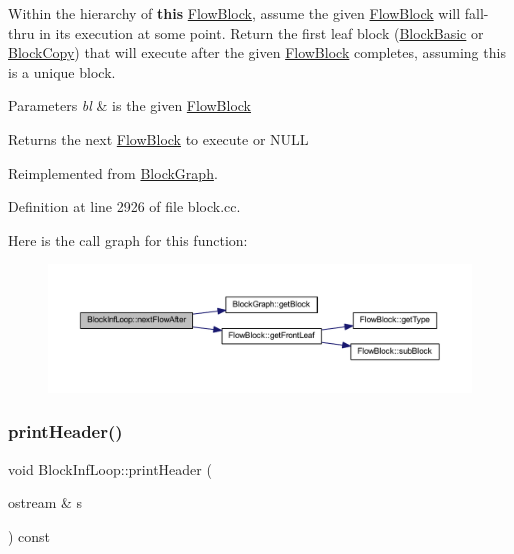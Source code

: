 Within the hierarchy of {\bfseries{this}} \mbox{\hyperlink{class_flow_block}{Flow\+Block}}, assume the given \mbox{\hyperlink{class_flow_block}{Flow\+Block}} will fall-\/thru in its execution at some point. Return the first leaf block (\mbox{\hyperlink{class_block_basic}{Block\+Basic}} or \mbox{\hyperlink{class_block_copy}{Block\+Copy}}) that will execute after the given \mbox{\hyperlink{class_flow_block}{Flow\+Block}} completes, assuming this is a unique block. 
\begin{DoxyParams}{Parameters}
{\em bl} & is the given \mbox{\hyperlink{class_flow_block}{Flow\+Block}} \\
\hline
\end{DoxyParams}
\begin{DoxyReturn}{Returns}
the next \mbox{\hyperlink{class_flow_block}{Flow\+Block}} to execute or N\+U\+LL 
\end{DoxyReturn}


Reimplemented from \mbox{\hyperlink{class_block_graph_aba0d42cf572bdcf2bca44d22fad971f6}{Block\+Graph}}.



Definition at line 2926 of file block.\+cc.

Here is the call graph for this function\+:
\nopagebreak
\begin{figure}[H]
\begin{center}
\leavevmode
\includegraphics[width=350pt]{class_block_inf_loop_a10ef0de99961f931b7432b2662ac2677_cgraph}
\end{center}
\end{figure}
\mbox{\label{class_block_inf_loop_a52090deeaa2673ea5afedca0331d3027}} 
\subsubsection{\texorpdfstring{printHeader()}{printHeader()}}
{\footnotesize\ttfamily void Block\+Inf\+Loop\+::print\+Header (\begin{DoxyParamCaption}\item[{ostream \&}]{s }\end{DoxyParamCaption}) const\hspace{0.3cm}{\ttfamily [virtual]}}




